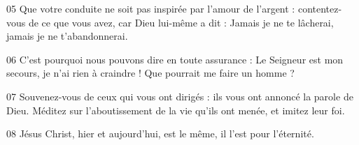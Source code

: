 
05 Que votre conduite ne soit pas inspirée par l’amour de l’argent : contentez-vous de ce que vous avez, car Dieu lui-même a dit : Jamais je ne te lâcherai, jamais je ne t’abandonnerai.

06 C’est pourquoi nous pouvons dire en toute assurance : Le Seigneur est mon secours, je n’ai rien à craindre ! Que pourrait me faire un homme ?

07 Souvenez-vous de ceux qui vous ont dirigés : ils vous ont annoncé la parole de Dieu. Méditez sur l’aboutissement de la vie qu’ils ont menée, et imitez leur foi.

08 Jésus Christ, hier et aujourd’hui, est le même, il l’est pour l’éternité.
